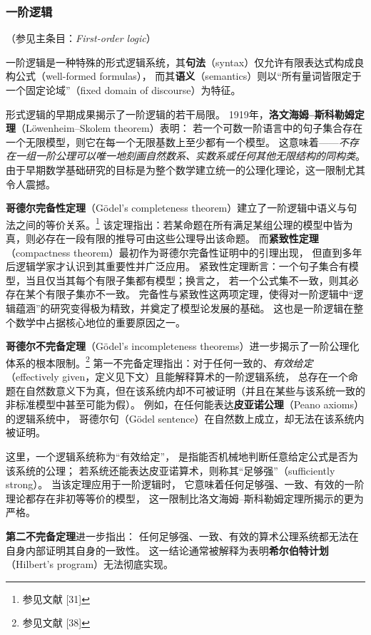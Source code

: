 \subsubsection{一阶逻辑}

（参见主条目：\textit{First-order logic}）

一阶逻辑是一种特殊的形式逻辑系统，其\textbf{句法}（syntax）仅允许有限表达式构成良构公式（well-formed formulas），  
而其\textbf{语义}（semantics）则以“所有量词皆限定于一个固定论域”（fixed domain of discourse）为特征。

形式逻辑的早期成果揭示了一阶逻辑的若干局限。  
1919年，\textbf{洛文海姆–斯科勒姆定理}（Löwenheim–Skolem theorem）表明：  
若一个可数一阶语言中的句子集合存在一个无限模型，则它在每一个无限基数上至少都有一个模型。  
这意味着——\textit{不存在一组一阶公理可以唯一地刻画自然数系、实数系或任何其他无限结构的同构类}。  
由于早期数学基础研究的目标是为整个数学建立统一的公理化理论，这一限制尤其令人震撼。

\textbf{哥德尔完备性定理}（Gödel’s completeness theorem）建立了一阶逻辑中语义与句法之间的等价关系。\footnote{参见文献 [31]}  
该定理指出：若某命题在所有满足某组公理的模型中皆为真，则必存在一段有限的推导可由这些公理导出该命题。  
而\textbf{紧致性定理}（compactness theorem）最初作为哥德尔完备性证明中的引理出现，  
但直到多年后逻辑学家才认识到其重要性并广泛应用。  
紧致性定理断言：一个句子集合有模型，当且仅当其每个有限子集都有模型；换言之，  
若一个公式集不一致，则其必存在某个有限子集亦不一致。  
完备性与紧致性这两项定理，使得对一阶逻辑中“逻辑蕴涵”的研究变得极为精致，并奠定了模型论发展的基础。  
这也是一阶逻辑在整个数学中占据核心地位的重要原因之一。

\textbf{哥德尔不完备定理}（Gödel’s incompleteness theorems）进一步揭示了一阶公理化体系的根本限制。\footnote{参见文献 [38]}  
第一不完备定理指出：对于任何一致的、\textit{有效给定}（effectively given，定义见下文）且能解释算术的一阶逻辑系统，  
总存在一个命题在自然数意义下为真，但在该系统内却不可被证明（并且在某些与该系统一致的非标准模型中甚至可能为假）。  
例如，在任何能表达\textbf{皮亚诺公理}（Peano axioms）的逻辑系统中，  
哥德尔句（Gödel sentence）在自然数上成立，却无法在该系统内被证明。

这里，一个逻辑系统称为“有效给定”，  
是指能否机械地判断任意给定公式是否为该系统的公理；  
若系统还能表达皮亚诺算术，则称其“足够强”（sufficiently strong）。  
当该定理应用于一阶逻辑时，  
它意味着任何足够强、一致、有效的一阶理论都存在非初等等价的模型，  
这一限制比洛文海姆–斯科勒姆定理所揭示的更为严格。  

\textbf{第二不完备定理}进一步指出：  
任何足够强、一致、有效的算术公理系统都无法在自身内部证明其自身的一致性。  
这一结论通常被解释为表明\textbf{希尔伯特计划}（Hilbert’s program）无法彻底实现。
